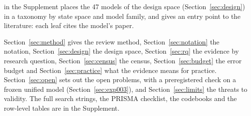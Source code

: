 \suppFigTree{} in the Supplement places the 47 models of the design space (Section~\ref{sec:design}) in a taxonomy by state space and model family, and gives an entry point to the literature: each leaf cites the model's paper. %


Section~\ref{sec:method} gives the review method, Section~\ref{sec:notation} the notation, Section~\ref{sec:design} the design space, Section~\ref{sec:rq} the evidence by research question, Section~\ref{sec:census} the census, Section~\ref{sec:budget} the error budget and Section~\ref{sec:practice} what the evidence means for practice. Section~\ref{sec:open} sets out the open problems, with a preregistered check on a frozen unified model (Section~\ref{sec:exp003}), and Section~\ref{sec:limits} the threats to validity. The full search strings, the PRISMA checklist, the codebooks and the row-level tables are in the Supplement.

